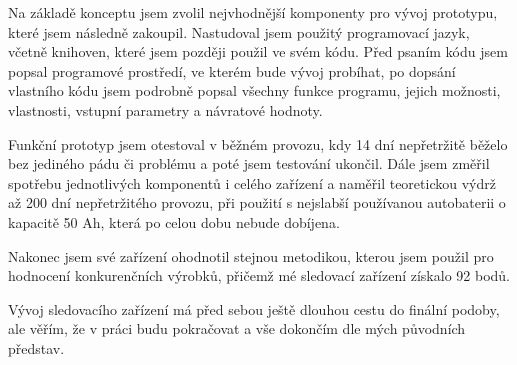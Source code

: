 \documentclass[FM,BP]{tulthesis}  %
\begin{document}
Na základě konceptu jsem zvolil nejvhodnější komponenty pro vývoj prototypu, které jsem následně zakoupil. Nastudoval jsem použitý programovací jazyk, včetně knihoven, které jsem později použil ve svém kódu. Před psaním kódu jsem popsal programové prostředí, ve kterém bude vývoj probíhat, po dopsání vlastního kódu jsem podrobně popsal všechny funkce programu, jejich možnosti, vlastnosti, vstupní parametry a návratové hodnoty. 

Funkční prototyp jsem otestoval v běžném provozu, kdy 14 dní nepřetržitě běželo bez jediného pádu či problému a poté jsem testování ukončil. Dále jsem změřil spotřebu jednotlivých komponentů i celého zařízení a naměřil teoretickou výdrž až 200 dní nepřetržitého provozu, při použití s nejslabší používanou autobaterii o kapacitě 50 Ah, která po celou dobu nebude dobíjena.

Nakonec jsem své zařízení ohodnotil stejnou metodikou, kterou jsem použil pro hodnocení konkurenčních výrobků, přičemž mé sledovací zařízení získalo 92 bodů.

Vývoj sledovacího zařízení má před sebou ještě dlouhou cestu do finální podoby, ale věřím, že v práci budu pokračovat a vše dokončím dle mých původních představ.

\end{document}
